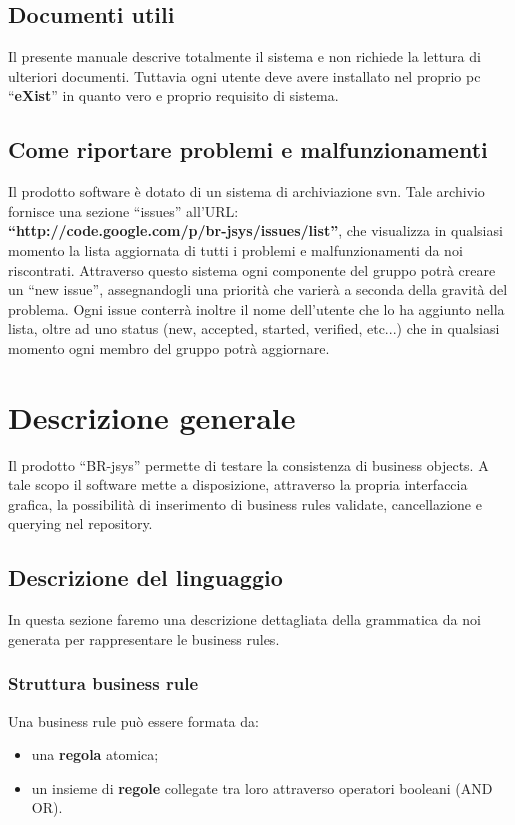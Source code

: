 \section{Documenti utili}
Il presente manuale descrive totalmente il sistema e non richiede la lettura di ulteriori documenti. Tuttavia ogni utente deve avere installato nel proprio pc ``\textbf{eXist}'' in quanto vero e proprio requisito di sistema. 
\section{Come riportare problemi e malfunzionamenti}
Il prodotto software \`e dotato di un sistema di archiviazione svn. Tale archivio fornisce una sezione ``issues'' all'URL: \\ 
\textbf{``http://code.google.com/p/br-jsys/issues/list''}, che visualizza in qualsiasi momento la lista aggiornata di tutti i problemi e malfunzionamenti da noi riscontrati. Attraverso questo sistema ogni componente del gruppo potr\`a creare un ``new issue'', assegnandogli una priorit\`a che varier\`a a seconda della gravit\`a del problema. Ogni issue conterr\`a inoltre il nome dell'utente che lo ha aggiunto nella lista, oltre ad uno status (new, accepted, started, verified, etc...) che in qualsiasi momento ogni membro del gruppo potr\`a aggiornare. 

\chapter{Descrizione generale}
Il prodotto ``BR-jsys'' permette di testare la consistenza di business objects. A tale scopo il software mette a disposizione, attraverso la propria interfaccia grafica, la possibilit\`a di inserimento di business rules validate, cancellazione e querying nel repository.
\section{Descrizione del linguaggio}
In questa sezione faremo una descrizione dettagliata della grammatica da noi generata per rappresentare le business rules. 
\subsection{Struttura business rule}
Una business rule pu\`o essere formata da:
\begin{itemize}
\item una \textbf{regola} atomica;
\item un insieme di \textbf{regole} collegate tra loro attraverso operatori booleani (AND \textbar OR).
\end{itemize}
